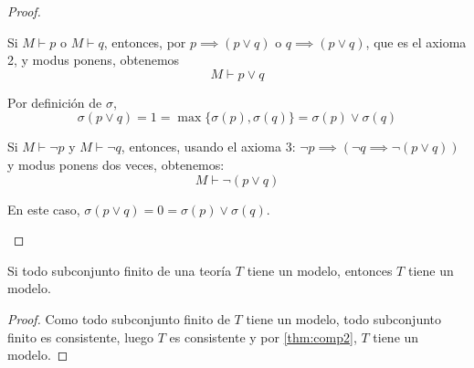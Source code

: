 \documentclass{apuntes}
\begin{document}
\begin{proof}
\begin{itemize}
\begin{enumerate}
			Si $M\vdash p$ o $M\vdash q$, entonces, por $p\implies (p\vee q)$ o $q\implies (p\vee q)$, que es el axioma 2, y modus ponens, obtenemos
			$$M\vdash p \vee q$$

			Por definición de $\sigma$,
			$$\sigma(p\vee q) = 1 = \max\{\sigma(p), \sigma(q)\} = \sigma(p)\vee\sigma(q)$$

			Si $M\vdash \neg p$ y $M\vdash \neg q$, entonces, usando el axioma 3: $\neg p \implies (\neg q \implies \neg(p\vee q))$ y modus ponens dos veces, obtenemos:
			$$M\vdash \neg(p\vee q)$$

			En este caso, $\sigma(p\vee q) = 0 = \sigma(p) \vee \sigma(q)$.
		\end{enumerate}
	\end{itemize}
\end{proof}

\begin{theorem}
	Si todo subconjunto finito de una teoría $T$ tiene un modelo, entonces $T$ tiene un modelo.
\end{theorem}
\begin{proof}
	Como todo subconjunto finito de $T$ tiene un modelo, todo subconjunto finito es consistente, luego $T$ es consistente y por \ref{thm:comp2}, $T$ tiene un modelo.
\end{proof}

\printindex
\end{document}
